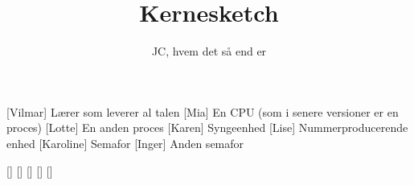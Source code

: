 \documentclass[a4paper,11pt]{article}
\title{Kernesketch}
\author{JC, hvem det så end er}
\begin{document}
\maketitle

\begin{roles}
[Vilmar] Lærer som leverer al talen
[Mia] En CPU (som i senere versioner er en proces)
[Lotte] En anden proces
[Karen] Syngeenhed
[Lise] Nummerproducerende enhed
[Karoline] Semafor
[Inger] Anden semafor
\end{roles}

\begin{props}
[]
[]
[]
[]
[]
\end{props}
\end{document}
